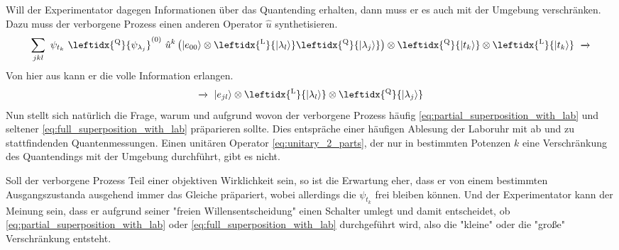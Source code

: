 \documentclass[12pt]{article}
\begin{document}
Will der Experimentator dagegen Informationen über das Quantending erhalten, dann muss er es auch mit der Umgebung verschränken. Dazu muss der verborgene Prozess einen anderen Operator $\hat{u}$ synthetisieren.
\begin{equation}
\label{eq:full_superposition_with_lab}
\sum_{jkl} \ \psi_{t_k}\ \leftidx{^\mathrm{Q}}{\psi_{\lambda_j}}^{(0)}\ 
\hat{u}^k \left( \ket{e_{00}} \otimes \leftidx{^\mathrm{L}}{\ket{\lambda_l}} 
\leftidx{^\mathrm{Q}}{\ket{\lambda_j}} \right) 
\otimes \leftidx{^\mathrm{Q}}{\ket{t_k}}
\otimes \leftidx{^\mathrm{L}}{\ket{t_k}}
\ \xrightarrow{}
\end{equation}
Von hier aus kann er die volle Information erlangen.
\begin{equation*}
\xrightarrow{}\ \ket{e_{jl}} 
\otimes \leftidx{^\mathrm{L}}{\ket{\lambda_l}} 
\otimes \leftidx{^\mathrm{Q}}{\ket{\lambda_j}}
\end{equation*}
Nun stellt sich natürlich die Frage, warum und aufgrund wovon der verborgene Prozess häufig \eqref{eq:partial_superposition_with_lab} und seltener \eqref{eq:full_superposition_with_lab} präparieren sollte. Dies entspräche einer häufigen Ablesung der Laboruhr mit ab und zu stattfindenden Quantenmessungen. Einen unitären Operator \eqref{eq:unitary_2_parts}, der nur in bestimmten Potenzen $k$ eine Verschränkung des Quantendings mit der Umgebung durchführt, gibt es nicht.

Soll der verborgene Prozess Teil einer objektiven Wirklichkeit sein, so ist die Erwartung eher, dass er von einem bestimmten Ausgangszustanda ausgehend immer das Gleiche präpariert, wobei allerdings die $\psi_{t_k}$ frei bleiben können. Und der Experimentator kann der Meinung sein, dass er aufgrund seiner "freien Willensentscheidung" einen Schalter umlegt und damit entscheidet, ob \eqref{eq:partial_superposition_with_lab} oder \eqref{eq:full_superposition_with_lab} durchgeführt wird, also die "kleine" oder die "große" Verschränkung entsteht.
\end{document}
